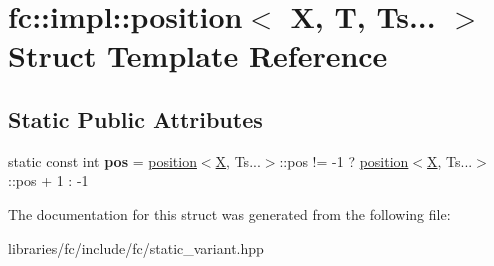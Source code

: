 \hypertarget{structfc_1_1impl_1_1position_3_01_x_00_01_t_00_01_ts_8_8_8_01_4}{}\section{fc\+:\+:impl\+:\+:position$<$ X, T, Ts... $>$ Struct Template Reference}
\label{structfc_1_1impl_1_1position_3_01_x_00_01_t_00_01_ts_8_8_8_01_4}
\subsection*{Static Public Attributes}
\begin{DoxyCompactItemize}
\item 
\mbox{\label{structfc_1_1impl_1_1position_3_01_x_00_01_t_00_01_ts_8_8_8_01_4_a767afee10afcf64f8fc0a541b1716c98}} 
static const int {\bfseries pos} = \mbox{\hyperlink{structfc_1_1impl_1_1position}{position}}$<$\mbox{\hyperlink{class_x}{X}}, Ts...$>$\+::pos != -\/1 ? \mbox{\hyperlink{structfc_1_1impl_1_1position}{position}}$<$\mbox{\hyperlink{class_x}{X}}, Ts...$>$\+::pos + 1 \+: -\/1
\end{DoxyCompactItemize}


The documentation for this struct was generated from the following file\+:\begin{DoxyCompactItemize}
\item 
libraries/fc/include/fc/static\+\_\+variant.\+hpp\end{DoxyCompactItemize}
